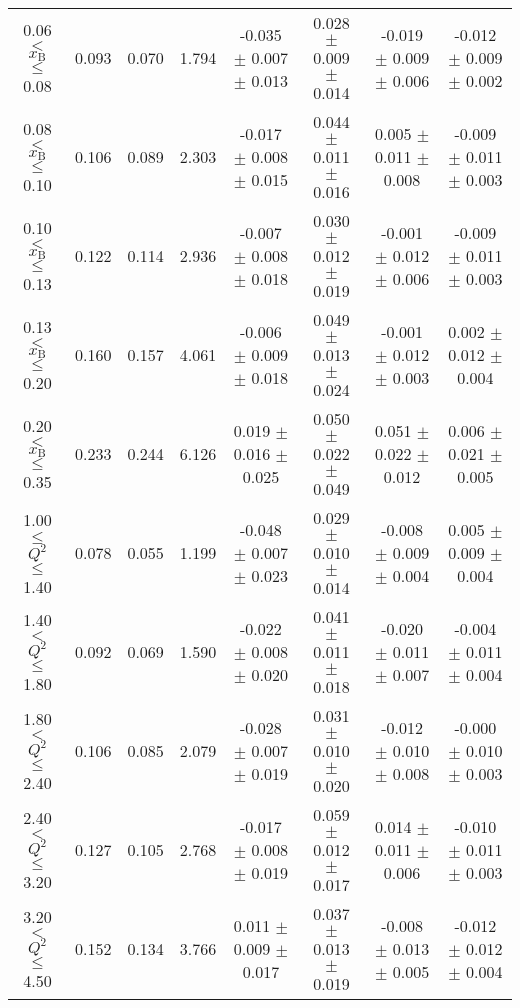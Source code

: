 \begin{table}[width=15cm]
\begin{center}
{\begin{tabular}{|c|c|c|c|c|c|c|c|}
0.06 $<$ $x_{\textrm{B}}$ $\leqslant$ 0.08 & 0.093  & 0.070 & 1.794  &   -0.035  $\pm$  0.007  $\pm$   0.013 &
0.028  $\pm$  0.009  $\pm$   0.014 & -0.019  $\pm$ 0.009  $\pm$  0.006 & -0.012   $\pm$  0.009   $\pm$   0.002\\
0.08 $<$ $x_{\textrm{B}}$ $\leqslant$ 0.10 &  0.106 & 0.089 &  2.303 &  -0.017  $\pm$  0.008  $\pm$   0.015 & 
0.044  $\pm$  0.011  $\pm$   0.016 & 0.005 $\pm$  0.011 $\pm$    0.008 & -0.009   $\pm$  0.011    $\pm$  0.003\\
0.10 $<$ $x_{\textrm{B}}$ $\leqslant$ 0.13 &  0.122 & 0.114  & 2.936  &  -0.007  $\pm$  0.008  $\pm$   0.018 & 
0.030  $\pm$  0.012 $\pm$   0.019 & -0.001 $\pm$  0.012  $\pm$   0.006 & -0.009   $\pm$  0.011  $\pm$    0.003\\
0.13 $<$ $x_{\textrm{B}}$ $\leqslant$ 0.20 &  0.160 & 0.157 & 4.061 &   -0.006   $\pm$ 0.009  $\pm$   0.018 & 
0.049  $\pm$  0.013 $\pm$    0.024 & -0.001  $\pm$  0.012  $\pm$   0.003 & 0.002   $\pm$  0.012   $\pm$  0.004\\
0.20 $<$ $x_{\textrm{B}}$ $\leqslant$ 0.35 & 0.233  & 0.244 &  6.126 &  0.019 $\pm$  0.016   $\pm$  0.025 & 
0.050  $\pm$  0.022   $\pm$  0.049 & 0.051  $\pm$  0.022  $\pm$   0.012 & 0.006  $\pm$   0.021  $\pm$   0.005\\
\hline
1.00 $\leqslant$ $Q^{2}$ $\leqslant$ 1.40 &  0.078 &  0.055 & 1.199 &  -0.048  $\pm$  0.007  $\pm$   0.023 & 
0.029  $\pm$  0.010  $\pm$   0.014 &  -0.008 $\pm$  0.009  $\pm$  0.004 & 0.005  $\pm$  0.009   $\pm$   0.004\\
1.40 $<$ $Q^{2}$ $\leqslant$ 1.80 & 0.092  & 0.069 &  1.590 &  -0.022  $\pm$  0.008  $\pm$   0.020 & 
0.041  $\pm$  0.011  $\pm$   0.018 & -0.020  $\pm$  0.011  $\pm$  0.007 & -0.004  $\pm$  0.011   $\pm$  0.004\\
1.80 $<$ $Q^{2}$ $\leqslant$ 2.40 &  0.106 & 0.085 &  2.079 &  -0.028  $\pm$  0.007  $\pm$   0.019 &
 0.031  $\pm$  0.010  $\pm$   0.020 & -0.012 $\pm$   0.010  $\pm$  0.008 & -0.000  $\pm$   0.010  $\pm$  0.003\\
2.40 $<$ $Q^{2}$ $\leqslant$ 3.20 &  0.127 &  0.105 & 2.768 &  -0.017 $\pm$   0.008  $\pm$   0.019 &  
0.059  $\pm$  0.012  $\pm$   0.017 & 0.014  $\pm$  0.011  $\pm$  0.006 & -0.010  $\pm$  0.011  $\pm$  0.003\\
3.20 $<$ $Q^{2}$ $\leqslant$ 4.50 &   0.152 & 0.134 &  3.766 &  0.011  $\pm$  0.009   $\pm$  0.017 & 
0.037 $\pm$   0.013  $\pm$   0.019 & -0.008  $\pm$  0.013 $\pm$ 0.005 & -0.012   $\pm$  0.012  $\pm$  0.004\\

\end{tabular}}
\end{center}
\end{table}
